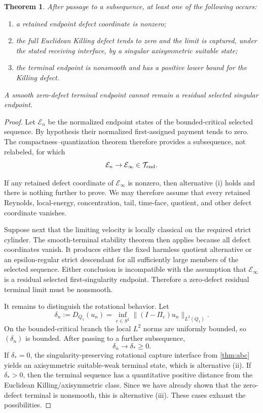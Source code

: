 \documentclass[11pt]{article}
\newtheorem{theorem}{Theorem}[section]
\theoremstyle{definition}\newtheorem{problem}[theorem]{Problem}
\theoremstyle{definition}
\theoremstyle{remark}
\begin{document}
\begin{theorem}\label{thm:payment-terminal}
After passage to a subsequence, at least one of the following occurs:
\begin{enumerate}[label=(\roman*),leftmargin=*]
\item a retained endpoint defect coordinate is nonzero;
\item the full Euclidean Killing defect tends to zero and the limit is captured, under the stated receiving interface, by a singular axisymmetric suitable state;
\item the terminal endpoint is nonsmooth and has a positive lower bound for the Killing defect.
\end{enumerate}
A smooth zero-defect terminal endpoint cannot remain a residual selected singular endpoint.
\end{theorem}
\begin{proof}
Let \(\mathcal E_n\) be the normalized endpoint states of the bounded-critical
selected sequence.  By hypothesis their normalized first-assigned payment
tends to zero.  The compactness--quantization theorem therefore provides a
subsequence, not relabeled, for which
\[
 \mathcal E_n\to\mathcal E_\infty\in\mathcal T_{\rm end}.
\]

If any retained defect coordinate of \(\mathcal E_\infty\) is nonzero, then
alternative (i) holds and there is nothing further to prove.  We may therefore
assume that every retained Reynolds, local-energy, concentration, tail,
time-face, quotient, and other defect coordinate vanishes.

Suppose next that the limiting velocity is locally classical on the required
strict cylinder.  The smooth-terminal stability theorem then applies because
all defect coordinates vanish.  It produces either the fixed harmless
quotient alternative or an epsilon-regular strict descendant for all
sufficiently large members of the selected sequence.  Either conclusion is
incompatible with the assumption that \(\mathcal E_\infty\) is a residual
selected first-singularity endpoint.  Therefore a zero-defect residual
terminal limit must be nonsmooth.

It remains to distinguish the rotational behavior.  Let
\[
 \delta_n:=D_{Q_1}(u_n)
 =\inf_{e\in S^2}\|(I-\Pi_e)u_n\|_{L^2(Q_1)}.
\]
On the bounded-critical branch the local \(L^2\) norms are uniformly bounded,
so \((\delta_n)\) is bounded.  After passing to a further subsequence,
\[
 \delta_n\to\delta_*\ge0.
\]
If \(\delta_*=0\), the singularity-preserving rotational capture interface
from \cref{thm:abc} yields an axisymmetric suitable-weak terminal state,
which is alternative (ii).  If \(\delta_*>0\), then the terminal sequence has
a quantitative positive distance from the Euclidean Killing/axisymmetric
class.  Since we have already shown that the zero-defect terminal is
nonsmooth, this is alternative (iii).  These cases exhaust the possibilities.
\end{proof}
\end{document}
